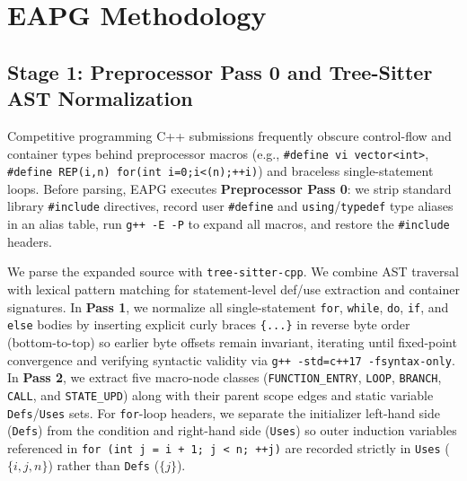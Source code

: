 \section{EAPG Methodology}
\label{sec:methodology}

\subsection{Stage 1: Preprocessor Pass 0 and Tree-Sitter AST Normalization}
Competitive programming C++ submissions frequently obscure control-flow and container types behind preprocessor macros (e.g., \texttt{\#define vi vector<int>}, \texttt{\#define REP(i,n) for(int i=0;i<(n);++i)}) and braceless single-statement loops. Before parsing, EAPG executes \textbf{Preprocessor Pass 0}: we strip standard library \texttt{\#include} directives, record user \texttt{\#define} and \texttt{using}/\texttt{typedef} type aliases in an alias table, run \texttt{g++ -E -P} to expand all macros, and restore the \texttt{\#include} headers.

We parse the expanded source with \texttt{tree-sitter-cpp}. We combine AST traversal with lexical pattern matching for statement-level def/use extraction and container signatures. In \textbf{Pass 1}, we normalize all single-statement \texttt{for}, \texttt{while}, \texttt{do}, \texttt{if}, and \texttt{else} bodies by inserting explicit curly braces \texttt{\{...\}} in reverse byte order (bottom-to-top) so earlier byte offsets remain invariant, iterating until fixed-point convergence and verifying syntactic validity via \texttt{g++ -std=c++17 -fsyntax-only}. In \textbf{Pass 2}, we extract five macro-node classes (\texttt{FUNCTION\_ENTRY}, \texttt{LOOP}, \texttt{BRANCH}, \texttt{CALL}, and \texttt{STATE\_UPD}) along with their parent scope edges and static variable \texttt{Defs}/\texttt{Uses} sets. For \texttt{for}-loop headers, we separate the initializer left-hand side (\texttt{Defs}) from the condition and right-hand side (\texttt{Uses}) so outer induction variables referenced in \texttt{for (int j = i + 1; j < n; ++j)} are recorded strictly in \texttt{Uses} ($\{i,j,n\}$) rather than \texttt{Defs} ($\{j\}$).

